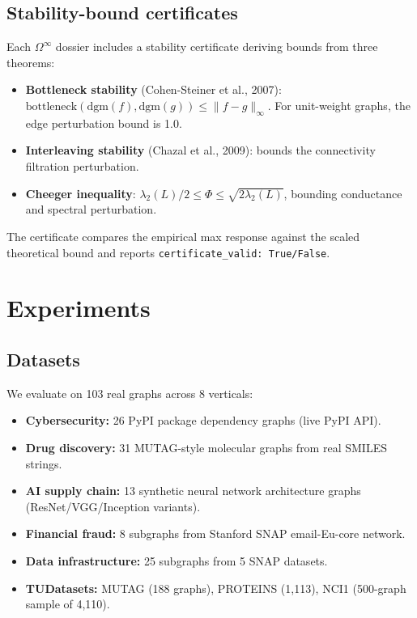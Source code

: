 \documentclass[11pt]{article}
\begin{document}
\subsection{Stability-bound certificates}

Each $\Omega^\infty$ dossier includes a stability certificate deriving bounds from three theorems:
\begin{itemize}
    \item \textbf{Bottleneck stability} (Cohen-Steiner et al., 2007): $\text{bottleneck}(\text{dgm}(f), \text{dgm}(g)) \leq \|f - g\|_\infty$. For unit-weight graphs, the edge perturbation bound is 1.0.
    \item \textbf{Interleaving stability} (Chazal et al., 2009): bounds the connectivity filtration perturbation.
    \item \textbf{Cheeger inequality}: $\lambda_2(L)/2 \leq \Phi \leq \sqrt{2\lambda_2(L)}$, bounding conductance and spectral perturbation.
\end{itemize}
The certificate compares the empirical max response against the scaled theoretical bound and reports \texttt{certificate\_valid: True/False}.

\section{Experiments}

\subsection{Datasets}

We evaluate on 103 real graphs across 8 verticals:
\begin{itemize}
    \item \textbf{Cybersecurity:} 26 PyPI package dependency graphs (live PyPI API).
    \item \textbf{Drug discovery:} 31 MUTAG-style molecular graphs from real SMILES strings.
    \item \textbf{AI supply chain:} 13 synthetic neural network architecture graphs (ResNet/VGG/Inception variants).
    \item \textbf{Financial fraud:} 8 subgraphs from Stanford SNAP email-Eu-core network.
    \item \textbf{Data infrastructure:} 25 subgraphs from 5 SNAP datasets.
    \item \textbf{TUDatasets:} MUTAG (188 graphs), PROTEINS (1,113), NCI1 (500-graph sample of 4,110).
\end{itemize}
\end{document}
